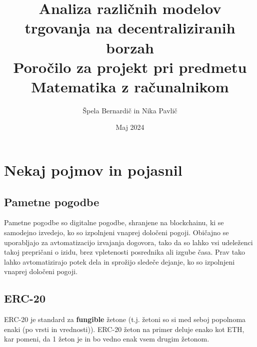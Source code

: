 \documentclass[a4paper,12pt]{article}%
\title{Analiza različnih modelov trgovanja na decentraliziranih borzah \\ \large Poročilo za projekt pri predmetu Matematika z računalnikom}
\date{Maj 2024}
\author{Špela Bernardič in Nika Pavlič}
\begin{document}
\maketitle

\section{Nekaj pojmov in pojasnil} 

\subsection{Pametne pogodbe} 
Pametne pogodbe so digitalne pogodbe, shranjene na blockchainu, ki se samodejno izvedejo, ko so izpolnjeni vnaprej določeni pogoji.
Običajno se uporabljajo za avtomatizacijo izvajanja dogovora, tako da so lahko vsi udeleženci takoj prepričani o izidu, 
brez vpletenosti posrednika ali izgube časa. Prav tako lahko avtomatizirajo potek dela in sprožijo sledeče dejanje, 
ko so izpolnjeni vnaprej določeni pogoji.

\subsection{ERC-20 }

ERC-20 je standard za \textbf{fungible} žetone (t.j. žetoni so si med seboj popolnoma enaki (po vrsti in vrednosti)). ERC-20 žeton na primer deluje enako kot ETH, kar pomeni, da 1 žeton je in bo vedno enak vsem drugim žetonom.







\end{document}
